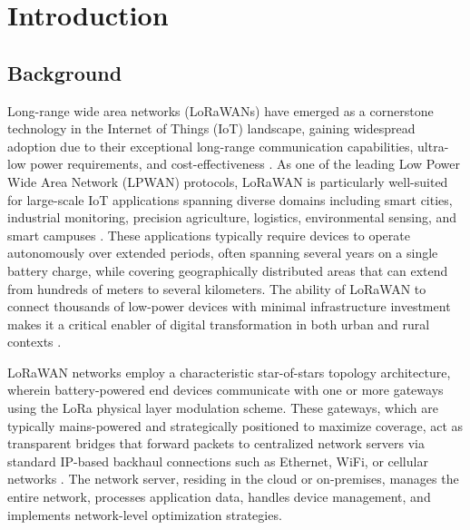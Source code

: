 \documentclass[12pt,a4paper]{article}
\begin{document}
\newpage
\tableofcontents
\newpage

\section{Introduction}
\label{sec:introduction}

\subsection{Background}
\label{subsec:background}

Long-range wide area networks (LoRaWANs) have emerged as a cornerstone technology in the Internet of Things (IoT) landscape, gaining widespread adoption due to their exceptional long-range communication capabilities, ultra-low power requirements, and cost-effectiveness \cite{Raza17}. As one of the leading Low Power Wide Area Network (LPWAN) protocols, LoRaWAN is particularly well-suited for large-scale IoT applications spanning diverse domains including smart cities, industrial monitoring, precision agriculture, logistics, environmental sensing, and smart campuses \cite{Maurya2025LoRaWANsurvey}. These applications typically require devices to operate autonomously over extended periods, often spanning several years on a single battery charge, while covering geographically distributed areas that can extend from hundreds of meters to several kilometers. The ability of LoRaWAN to connect thousands of low-power devices with minimal infrastructure investment makes it a critical enabler of digital transformation in both urban and rural contexts \cite{augustin2016study}.

LoRaWAN networks employ a characteristic star-of-stars topology architecture, wherein battery-powered end devices communicate with one or more gateways using the LoRa physical layer modulation scheme. These gateways, which are typically mains-powered and strategically positioned to maximize coverage, act as transparent bridges that forward packets to centralized network servers via standard IP-based backhaul connections such as Ethernet, WiFi, or cellular networks \cite{adelantado2017understanding}. The network server, residing in the cloud or on-premises, manages the entire network, processes application data, handles device management, and implements network-level optimization strategies.
\end{document}
